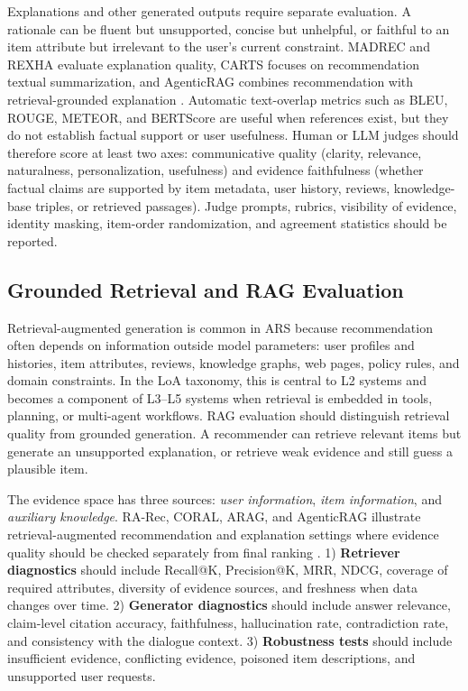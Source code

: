 Explanations and other generated outputs require separate evaluation. A rationale can be fluent but unsupported, concise but unhelpful, or faithful to an item attribute but irrelevant to the user's current constraint. MADREC and REXHA evaluate explanation quality, CARTS focuses on recommendation textual summarization, and AgenticRAG combines recommendation with retrieval-grounded explanation \cite{park2025madrec,sun2025retrieval,chen2025carts,ma2025agenticrag}. Automatic text-overlap metrics such as BLEU, ROUGE, METEOR, and BERTScore are useful when references exist, but they do not establish factual support or user usefulness. Human or LLM judges should therefore score at least two axes: communicative quality (clarity, relevance, naturalness, personalization, usefulness) and evidence faithfulness (whether factual claims are supported by item metadata, user history, reviews, knowledge-base triples, or retrieved passages). Judge prompts, rubrics, visibility of evidence, identity masking, item-order randomization, and agreement statistics should be reported.

\subsection{Grounded Retrieval and RAG Evaluation}
\label{subsec:rag-eval}

Retrieval-augmented generation is common in ARS because recommendation often depends on information outside model parameters: user profiles and histories, item attributes, reviews, knowledge graphs, web pages, policy rules, and domain constraints. In the LoA taxonomy, this is central to L2 systems and becomes a component of L3--L5 systems when retrieval is embedded in tools, planning, or multi-agent workflows. RAG evaluation should distinguish retrieval quality from grounded generation. A recommender can retrieve relevant items but generate an unsupported explanation, or retrieve weak evidence and still guess a plausible item.


The evidence space has three sources:  \emph{user information}, \emph{item information}, and \emph{auxiliary knowledge}. 
RA-Rec, CORAL, ARAG, and AgenticRAG illustrate retrieval-augmented recommendation and explanation settings where evidence quality should be checked separately from final ranking \cite{kemper2024retrieval,wu2024coral,maragheh2025arag,ma2025agenticrag}. 
1) \textbf{Retriever diagnostics} should include Recall@K, Precision@K, MRR, NDCG, coverage of required attributes, diversity of evidence sources, and freshness when data changes over time. 
2) \textbf{Generator diagnostics} should include answer relevance, claim-level citation accuracy, faithfulness, hallucination rate, contradiction rate, and consistency with the dialogue context. 
3) \textbf{Robustness tests} should include insufficient evidence, conflicting evidence, poisoned item descriptions, and unsupported user requests.



